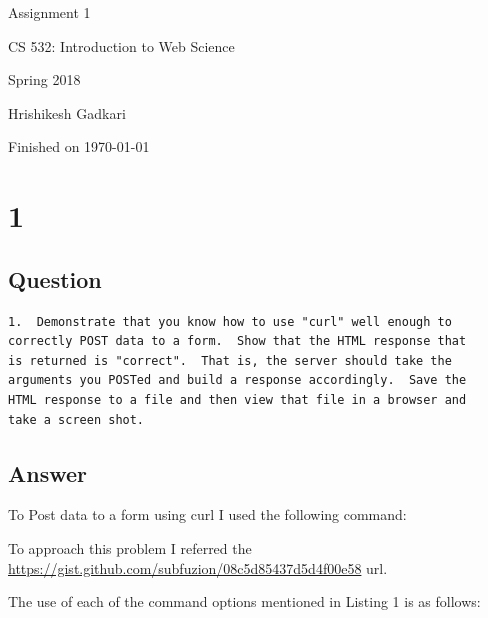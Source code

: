 \documentclass[letterpaper,12pt]{article}
\begin{document}
\begin{titlepage}

\begin{center}

\Huge{Assignment 1}

\Large{CS 532:  Introduction to Web Science}

\Large{Spring 2018}

\Large{Hrishikesh Gadkari}

\Large Finished on \today

\end{center}

\end{titlepage}

\newpage


\section*{1}


\subsection*{Question}

\begin{verbatim}
1.  Demonstrate that you know how to use "curl" well enough to
correctly POST data to a form.  Show that the HTML response that
is returned is "correct".  That is, the server should take the
arguments you POSTed and build a response accordingly.  Save the
HTML response to a file and then view that file in a browser and
take a screen shot.
\end{verbatim}

\subsection*{Answer}

To Post data to a form using curl I used the following command:



To approach this problem I referred the \url{https://gist.github.com/subfuzion/08c5d85437d5d4f00e58} url.

The use of each of the command options mentioned in Listing 1 is as follows:
\end{document}

